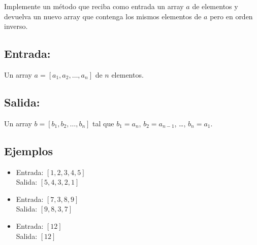 Implemente un método que reciba como entrada un array \(a\) de elementos y devuelva un nuevo array que contenga los mismos elementos de \(a\) pero en orden inverso.

\subsection*{Entrada:}

Un array \(a = [a_1, a_2, \dots, a_n]\) de \(n\) elementos.

\subsection*{Salida:}

Un array \(b = [b_1, b_2, \dots, b_n]\) tal que \(b_1 = a_n\), \(b_2 = a_{n-1}\), \dots, \(b_n = a_1\).

\subsection*{Ejemplos}
\begin{itemize}
    \item Entrada: \([1, 2, 3, 4, 5]\) \\
    Salida: \([5, 4, 3, 2, 1]\)
    \item Entrada: \([7, 3, 8, 9]\) \\
    Salida: \([9, 8, 3, 7]\)
    \item Entrada: \([12]\) \\
    Salida: \([12]\)
\end{itemize}
